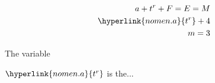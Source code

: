 \documentclass{article}
\newcommand{\ignore}[2]{\hspace{0in}#2}
\newcommand{\tr}{\hyperlink{nomen.a}{t^r}}
\begin{document}
  \lipsum[1-2]
  \begin{align*}
    a + t^{r} + F = E = M\\
    \tr + 4\\
    m=3
  \end{align*}
  
  The variable   $\tr$ is the...

\clearpage
\printnomenclature[1.5cm]   %
\end{document}
